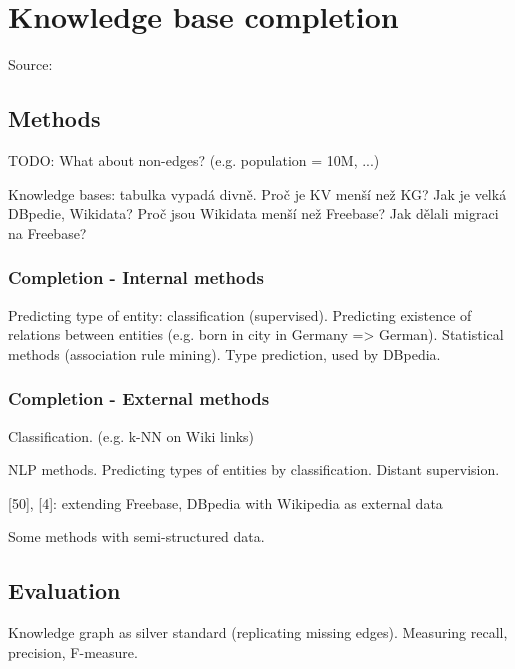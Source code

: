 \chapter{Knowledge base completion}

Source: \cite{kg-refinement-survey}

\section{Methods}

TODO: What about non-edges? (e.g. population = 10M, ...)

Knowledge bases: tabulka vypadá divně. Proč je KV menší než KG?
Jak je velká DBpedie, Wikidata? Proč jsou Wikidata menší než Freebase?
Jak dělali migraci na Freebase?

\subsection{Completion - Internal methods}

Predicting type of entity: classification (supervised).
Predicting existence of relations between entities (e.g. born in city in Germany
=> German).
Statistical methods (association rule mining). Type prediction, used by DBpedia.

\subsection{Completion - External methods}

Classification. (e.g. k-NN on Wiki links)

NLP methods. Predicting types of entities by classification.
Distant supervision.

[50], [4]: extending Freebase, DBpedia with Wikipedia as external data

Some methods with semi-structured data.

\section{Evaluation}

Knowledge graph as silver standard (replicating missing edges).
Measuring recall, precision, F-measure.
